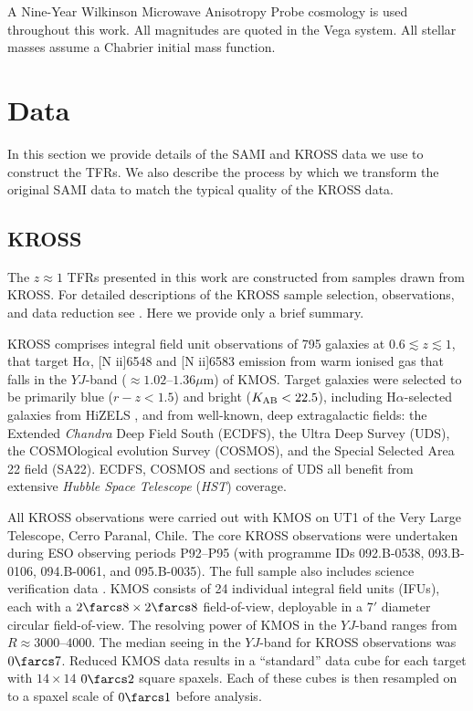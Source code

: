 \documentclass[a4paper,fleqn,usenatbib]{mnras}
\begin{document}
A Nine-Year Wilkinson Microwave Anisotropy Probe \citep[WMAP9;][]{Hinshaw:2013} cosmology  is used throughout this work. All magnitudes are quoted in the Vega system. All stellar masses assume a Chabrier \citep{Chabrier:2003aa} initial mass function. 

\section{Data}
\label{sec:data}

In this section we provide details of the SAMI and KROSS data we use to construct the TFRs. We also describe the process by which we transform the original SAMI data to match the typical quality of the KROSS data.

\subsection{KROSS}
\label{subsec:KROSS}

The $z\approx1$ TFRs presented in this work are constructed from samples drawn from KROSS. For detailed descriptions of the KROSS sample selection, observations, and data reduction see \citet{Stott:2016}. Here we provide only a brief summary. 

KROSS comprises integral field unit observations of 795 galaxies at $0.6 \lesssim z \lesssim 1$, that target H$\alpha$, [N {\sc ii}]6548 and [N {\sc ii}]6583 emission from warm ionised gas that falls in the $YJ$-band ($\approx1.02$--$1.36 \mu$m) of KMOS. Target galaxies were selected to be primarily blue ($r-z<1.5$) and bright ($K_{\rm{AB}} < 22.5$), including H$\alpha$-selected galaxies from HiZELS \citep{Sobral:2013a,Sobral:2015}, and from well-known, deep extragalactic fields: the Extended {\it Chandra} Deep Field South (ECDFS), the Ultra Deep Survey (UDS), the COSMOlogical evolution Survey (COSMOS), and the Special Selected Area 22 field (SA22). ECDFS, COSMOS and sections of UDS all benefit from extensive {\it Hubble Space Telescope} ({\it HST}) coverage. 

All KROSS observations were carried out with KMOS on UT1 of the Very Large Telescope, Cerro Paranal, Chile. The core KROSS observations were undertaken during ESO observing periods P92--P95 (with programme IDs 092.B-0538, 093.B-0106, 094.B-0061, and 095.B-0035). The full sample also includes science verification data \citep[60.A-9460;][]{Sobral:2013,Stott:2014}. KMOS consists of 24 individual integral field units (IFUs), each with a $2\farcs8 \times 2\farcs8$ field-of-view, deployable in a $7'$ diameter circular field-of-view. The resolving power of KMOS in the $YJ$-band ranges from $R\approx3000$--$4000$. The median seeing in the $YJ$-band for KROSS observations was $0\farcs7$. Reduced KMOS data results in a ``standard'' data cube for each target with $14 \times 14$ $0\farcs2$ square spaxels. Each of these cubes is then resampled on to a spaxel scale of $0\farcs1$ before analysis.  
\end{document}

